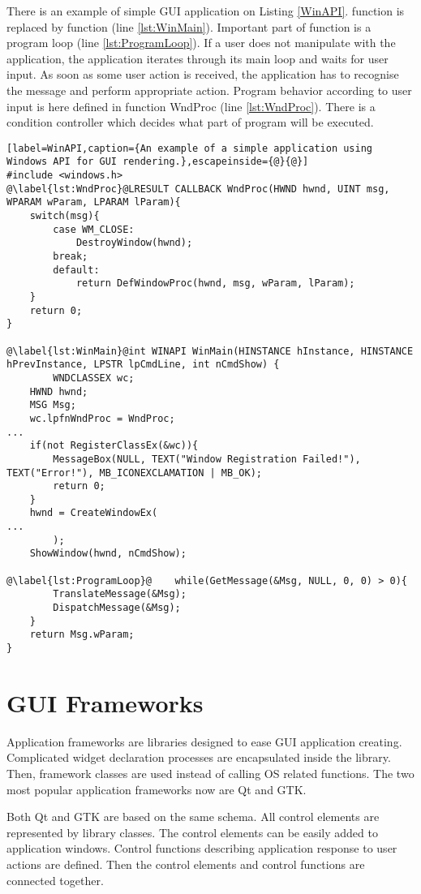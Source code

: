 There is an example of simple GUI application on Listing \ref{WinAPI}.  function is replaced by  function (line \ref{lst:WinMain}). Important part of  function is a program loop (line \ref{lst:ProgramLoop}). If a user does not manipulate with the application, the application iterates through its main loop and waits for user input. As soon as some user action is received, the application has to recognise the message and perform appropriate action. Program behavior according to user input is here defined in function WndProc (line \ref{lst:WndProc}). There is a condition controller which decides what part of program will be executed.

\begin{lstlisting}[label=WinAPI,caption={An example of a simple application using Windows API for GUI rendering.},escapeinside={@}{@}]
#include <windows.h>
@\label{lst:WndProc}@LRESULT CALLBACK WndProc(HWND hwnd, UINT msg, WPARAM wParam, LPARAM lParam){
    switch(msg){
        case WM_CLOSE:
            DestroyWindow(hwnd);
        break;
        default:
            return DefWindowProc(hwnd, msg, wParam, lParam);
    }
    return 0;
}

@\label{lst:WinMain}@int WINAPI WinMain(HINSTANCE hInstance, HINSTANCE hPrevInstance, LPSTR lpCmdLine, int nCmdShow) {
		WNDCLASSEX wc;
    HWND hwnd;
    MSG Msg;
    wc.lpfnWndProc = WndProc;    
...
    if(not RegisterClassEx(&wc)){
        MessageBox(NULL, TEXT("Window Registration Failed!"), TEXT("Error!"), MB_ICONEXCLAMATION | MB_OK);
        return 0;
    }
    hwnd = CreateWindowEx(
...
		);
    ShowWindow(hwnd, nCmdShow);

@\label{lst:ProgramLoop}@    while(GetMessage(&Msg, NULL, 0, 0) > 0){
        TranslateMessage(&Msg);
        DispatchMessage(&Msg);
    }
    return Msg.wParam;
}
\end{lstlisting}

\section{GUI Frameworks}
\label{guiframeworks}
Application frameworks are libraries designed to ease GUI application creating. Complicated widget declaration processes are encapsulated inside the library. Then, framework classes are used instead of calling OS related functions. The two most popular application frameworks now are Qt and GTK.

Both Qt and GTK are based on the same schema. All control elements are represented by library classes. The control elements can be easily added to application windows. Control functions describing application response to user actions are defined. Then the control elements and control functions are connected together.

